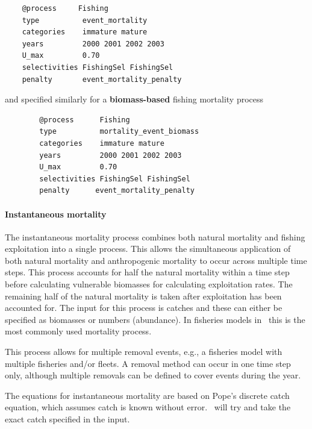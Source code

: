 {\small{\begin{verbatim}
	@process     Fishing
	type          event_mortality
	categories    immature mature
	years         2000 2001 2002 2003
	U_max         0.70
	selectivities FishingSel FishingSel
	penalty       event_mortality_penalty
	\end{verbatim}}}

and specified similarly for a \textbf{biomass-based} fishing mortality process

{\small{\begin{verbatim}
		@process      Fishing
		type          mortality_event_biomass
		categories    immature mature
		years         2000 2001 2002 2003
		U_max         0.70
		selectivities FishingSel FishingSel
		penalty      event_mortality_penalty
		\end{verbatim}}}

\paragraph{Instantaneous mortality}\label{sec:Process-MortalityInstantaneous}

The instantaneous mortality process combines both natural mortality and fishing exploitation into a single process. This allows the simultaneous application of both natural mortality and anthropogenic mortality to occur across multiple time steps. This process accounts for half the natural mortality within a time step before calculating vulnerable biomasses for calculating exploitation rates. The remaining half of the natural mortality is taken after exploitation has been accounted for. The input for this process is catches and these can either be specified as biomasses or numbers (abundance). In fisheries models in \CNAME\ this is the most commonly used mortality process.

This process allows for multiple removal events, e.g., a fisheries model with multiple fisheries and/or fleets. A removal method can occur in one time step only, although multiple removals can be defined to cover events during the year.

The equations for instantaneous mortality are based on Pope's discrete catch equation, which assumes catch is known without error. \CNAME\ will try and take the exact catch specified in the input.


